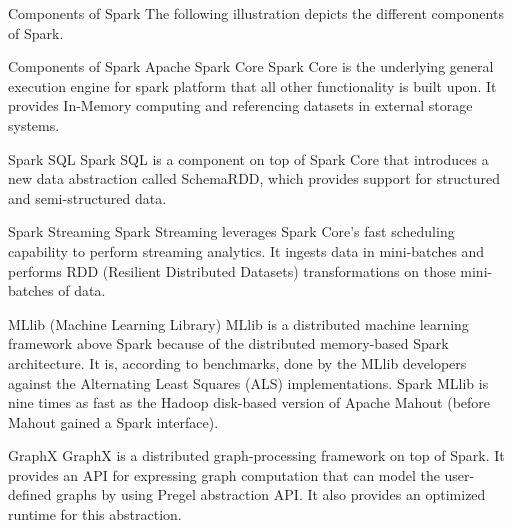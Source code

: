 Components of Spark
The following illustration depicts the different components of Spark.

Components of Spark
Apache Spark Core
Spark Core is the underlying general execution engine for spark platform that all other functionality is built upon. It provides In-Memory computing and referencing datasets in external storage systems.

Spark SQL
Spark SQL is a component on top of Spark Core that introduces a new data abstraction called SchemaRDD, which provides support for structured and semi-structured data.

Spark Streaming
Spark Streaming leverages Spark Core's fast scheduling capability to perform streaming analytics. It ingests data in mini-batches and performs RDD (Resilient Distributed Datasets) transformations on those mini-batches of data.

MLlib (Machine Learning Library)
MLlib is a distributed machine learning framework above Spark because of the distributed memory-based Spark architecture. It is, according to benchmarks, done by the MLlib developers against the Alternating Least Squares (ALS) implementations. Spark MLlib is nine times as fast as the Hadoop disk-based version of Apache Mahout (before Mahout gained a Spark interface).

GraphX
GraphX is a distributed graph-processing framework on top of Spark. It provides an API for expressing graph computation that can model the user-defined graphs by using Pregel abstraction API. It also provides an optimized runtime for this abstraction.
